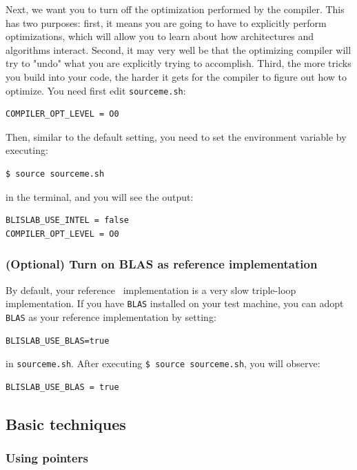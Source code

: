 Next, we want you to turn off the optimization performed by the compiler.  This has two purposes: first, it means you are going to have to explicitly perform optimizations, which will allow you to learn about how architectures and algorithms interact.  Second, it may very well be that the optimizing compiler will try to "undo" what you are explicitly trying to accomplish.  Third, the more tricks you build into your code, the harder it gets for the compiler to figure out how to optimize.
You need first edit {\tt sourceme.sh}: 
\begin{verbatim}
COMPILER_OPT_LEVEL = O0
\end{verbatim}
Then, similar to the default setting, you need to set the environment variable by executing:
\begin{verbatim}
$ source sourceme.sh
\end{verbatim}
in the terminal, and you will see the output:
\begin{verbatim}
BLISLAB_USE_INTEL = false
COMPILER_OPT_LEVEL = O0
\end{verbatim}

\subsubsection{(\textbf{Optional}) Turn on BLAS as reference implementation}

By default, your reference \Gemm\ implementation is a very slow triple-loop implementation.
If you have {\tt BLAS} installed on your test machine, you can adopt {\tt BLAS} as your reference implementation by setting:
\begin{verbatim}
BLISLAB_USE_BLAS=true
\end{verbatim}
in {\tt sourceme.sh}. After executing {\tt \$ source sourceme.sh}, you will observe:
\begin{verbatim}
BLISLAB_USE_BLAS = true
\end{verbatim}

\subsection{Basic techniques}

\subsubsection{Using pointers}


